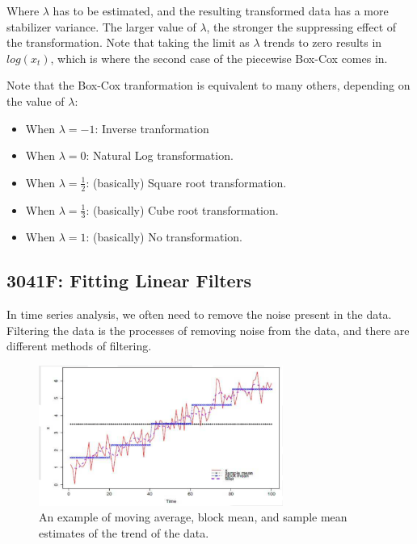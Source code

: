 \documentclass[12pt]{article}
\begin{document}
        Where $\lambda$ has to be estimated, and the resulting transformed data has a more stabilizer variance. 
        The larger value of $\lambda$, the stronger the suppressing effect of the transformation.
        Note that taking the limit as $\lambda$ trends to zero results in $log(x_t)$, which is where
        the second case of the piecewise Box-Cox comes in.

        Note that the Box-Cox tranformation is equivalent to many others, depending on the value of $\lambda$:
        \begin{itemize}
            \item When $\lambda = -1$: Inverse tranformation
            \item When $\lambda = 0$: Natural Log transformation.
            \item When $\lambda = \frac{1}{2}$: (basically) Square root transformation.
            \item When $\lambda = \frac{1}{3}$: (basically) Cube root transformation.
            \item When $\lambda = 1$: (basically) No transformation.
        \end{itemize}



        \subsection{3041F: Fitting Linear Filters}
        In time series analysis, we often need to remove the noise present in the data.
        Filtering the data is the processes of removing noise from the data, and there are different methods of filtering.
        \begin{figure}[t]
            \centering
            \includegraphics[width=8cm]{filtering_local_trends}
            \caption{An example of moving average, block mean, and sample mean estimates of
            the trend of the data.}
            \label{fig:filtering_local_trends}
        \end{figure}
\end{document}
